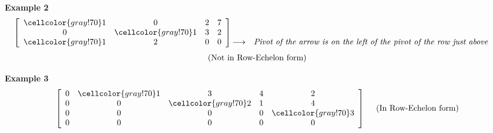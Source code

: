 \documentclass{article}
\newcommand\bg{\cellcolor{gray!70}}
\begin{document}
\textbf{Example 2} 
\[
 \left[\begin{array}{cccc}
    \bg1 &0 &2 &7\\  
     0 &\bg1 &3 &2\\
     \bg1 &2 &0 &0
  \end{array}\right]
  \begin{matrix}
    &&\\
    &&\\
    \longrightarrow &\emph{Pivot of the arrow is on the left of the pivot of the row just above}\\
  \end{matrix}\\
\]
\begin{align}
    \centering
  \text{(Not in Row-Echelon form)} \nonumber
\end{align}


\textbf{Example 3}
\[
\left[\begin{array}{ccccc}
    0 &\bg1 &3 &4 &2\\
    0 &0 &\bg2 &1 &4\\
    0 &0 &0 &0 &\bg3\\
    0 &0 &0 &0 &0
  \end{array}\right] ~~~~  \text{(In Row-Echelon form)}
\]


\end{document}
